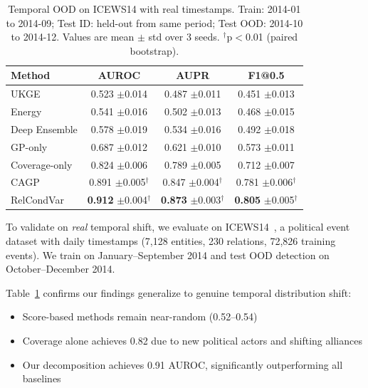 \begin{table}[t]
\centering
\caption{Temporal OOD on ICEWS14 with real timestamps. Train: 2014-01 to 2014-09; Test ID: held-out from same period; Test OOD: 2014-10 to 2014-12. Values are mean $\pm$ std over 3 seeds. $^\dagger$p$<$0.01 (paired bootstrap).}
\label{tab:icews}
\vspace{0.5em}
\small
\begin{tabular}{lccc}
\toprule
Method & AUROC & AUPR & F1@0.5 \\
\midrule
UKGE & 0.523 \tiny{$\pm$0.014} & 0.487 \tiny{$\pm$0.011} & 0.451 \tiny{$\pm$0.013} \\
Energy & 0.541 \tiny{$\pm$0.016} & 0.502 \tiny{$\pm$0.013} & 0.468 \tiny{$\pm$0.015} \\
Deep Ensemble & 0.578 \tiny{$\pm$0.019} & 0.534 \tiny{$\pm$0.016} & 0.492 \tiny{$\pm$0.018} \\
\midrule
GP-only & 0.687 \tiny{$\pm$0.012} & 0.621 \tiny{$\pm$0.010} & 0.573 \tiny{$\pm$0.011} \\
Coverage-only & 0.824 \tiny{$\pm$0.006} & 0.789 \tiny{$\pm$0.005} & 0.712 \tiny{$\pm$0.007} \\
\midrule
CAGP & 0.891 \tiny{$\pm$0.005}$^\dagger$ & 0.847 \tiny{$\pm$0.004}$^\dagger$ & 0.781 \tiny{$\pm$0.006}$^\dagger$ \\
RelCondVar & \textbf{0.912} \tiny{$\pm$0.004}$^\dagger$ & \textbf{0.873} \tiny{$\pm$0.003}$^\dagger$ & \textbf{0.805} \tiny{$\pm$0.005}$^\dagger$ \\
\bottomrule
\end{tabular}
\end{table}

To validate on \emph{real} temporal shift, we evaluate on ICEWS14~\citep{garcia2018learning}, a political event dataset with daily timestamps (7,128 entities, 230 relations, 72,826 training events).
We train on January--September 2014 and test OOD detection on October--December 2014.

Table~\ref{tab:icews} confirms our findings generalize to genuine temporal distribution shift:
\begin{itemize}
    \item Score-based methods remain near-random (0.52--0.54)
    \item Coverage alone achieves 0.82 due to new political actors and shifting alliances
    \item Our decomposition achieves 0.91 AUROC, significantly outperforming all baselines
\end{itemize}

